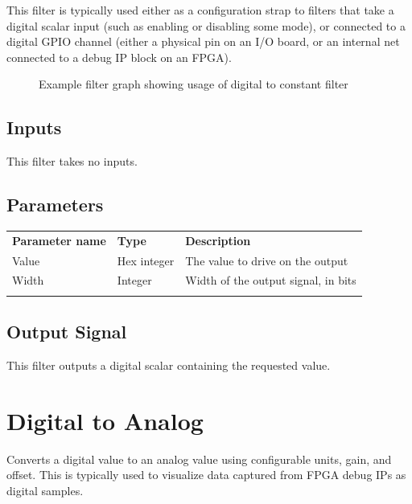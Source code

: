 This filter is typically used either as a configuration strap to filters that take a digital scalar input (such as
enabling or disabling some mode), or connected to a digital GPIO channel (either a physical pin on an I/O board, or an
internal net connected to a debug IP block on an FPGA).

\begin{figure}[h]
\centering
{}
\caption{Example filter graph showing usage of digital to constant filter}
\label{filter_digital_constant_graph}
\end{figure}

\subsection{Inputs}

This filter takes no inputs.

\subsection{Parameters}

\begin{tabularx}{16cm}{llX}
\thickhline
\textbf{Parameter name} & \textbf{Type} & \textbf{Description} \\
\thickhline
Value & Hex integer & The value to drive on the output\\
\thinhline
Width & Integer & Width of the output signal, in bits\\
\thickhline
\end{tabularx}

\subsection{Output Signal}

This filter outputs a digital scalar containing the requested value.

\pagebreak
\section{Digital to Analog}

Converts a digital value to an analog value using configurable units, gain, and offset. This is typically used to
visualize data captured from FPGA debug IPs as digital samples.

